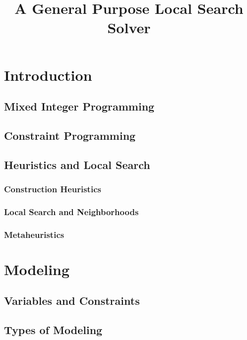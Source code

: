 \documentclass[a4paper,10pt]{article}
\title{A General Purpose Local Search Solver}
\begin{document}
\maketitle

\tableofcontents
\newpage
\section{Introduction}
  \subsection{Mixed Integer Programming}
  \subsection{Constraint Programming}
  \subsection{Heuristics and Local Search}
  \subsubsection{Construction Heuristics}
  \subsubsection{Local Search and Neighborhoods}
  \subsubsection{Metaheuristics}

\section{Modeling}

  \subsection{Variables and Constraints}
  
  \subsection{Types of Modeling}
  
\end{document}
